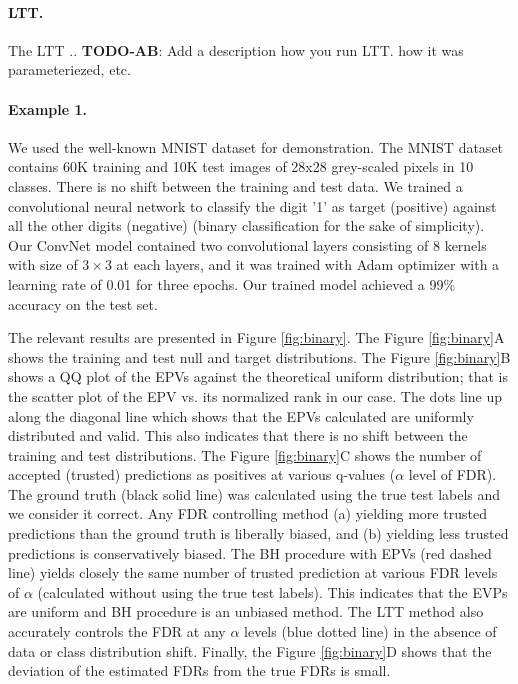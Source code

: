 \documentclass{article}
\newcommand{\todo}[2]{{\color{red} {\bf TODO-#1}: #2}}
\begin{document}
\paragraph{LTT.} The LTT .. \todo{AB}{Add a description how you run LTT. how it was parameteriezed, etc.}

\paragraph{Example 	 1.} \label{ex:vanilla} We used the well-known MNIST dataset for demonstration. The MNIST dataset contains 60K training and 10K test images of 28x28 grey-scaled pixels in 10 classes. There is no shift between the training and test data. We trained a convolutional neural network to classify the digit '1' as target (positive) against all the other digits (negative) (binary classification for the sake of simplicity). Our ConvNet model contained two convolutional layers consisting of 8 kernels with size of $3\times3$ at each layers, and it was trained with Adam optimizer with a learning rate of 0.01 for three epochs. Our trained model achieved a 99\% accuracy on the test set. 

The relevant results are presented in Figure \ref{fig:binary}. The Figure \ref{fig:binary}A shows the training and test null and target distributions. %
The Figure \ref{fig:binary}B shows a QQ plot of the EPVs against the theoretical uniform distribution; that is the scatter plot of the EPV vs. its normalized rank in our case. The dots line up along the diagonal line which shows that the EPVs calculated are uniformly distributed and valid. This also indicates that there is no shift between the training and test distributions. %
The Figure \ref{fig:binary}C shows the number of accepted (trusted) predictions as positives at various q-values ($\alpha$ level of FDR). The ground truth (black solid line) was calculated using the true test labels and we consider it correct. Any FDR controlling method (a) yielding more trusted predictions than the ground truth is liberally biased, and (b) yielding less trusted predictions is conservatively biased. The BH procedure with EPVs (red dashed line) yields closely the same number of trusted prediction at various FDR levels of $\alpha$ (calculated without using the true test labels). This indicates that the EVPs are uniform and BH procedure is an unbiased method. The LTT method also accurately controls the FDR at any $\alpha$ levels (blue dotted line) in the absence of data or class distribution shift. Finally, the Figure \ref{fig:binary}D shows that the deviation of the estimated FDRs from the true FDRs is small.
\end{document}
